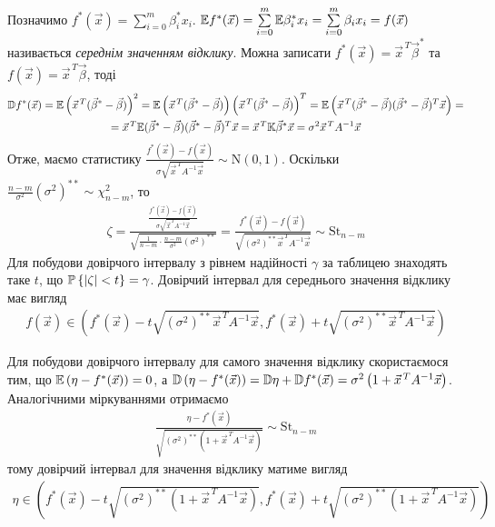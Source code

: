 Позначимо $f^*(\vec{x}) = \sum\limits_{i=0}^m \beta_i^* x_i$. 
$\E f^*(\vec{x}) = \sum\limits_{i=0}^m \E\beta_i^* x_i = \sum\limits_{i=0}^m \beta_i x_i = f(\vec{x})$
називається \emph{середнім значенням відклику}. Можна записати
$f^*(\vec{x}) = \vec{x}^{\, T} \vec{\beta}^*$ та $f(\vec{x}) = \vec{x}^{\, T} \vec{\beta}$, тоді
\begin{gather*}
    \D f^*(\vec{x}) = \E \left(\vec{x}^{\, T} (\vec{\beta}^* - \vec{\beta})\right)^2 = 
    \E \left(\vec{x}^{\, T} (\vec{\beta}^* - \vec{\beta})\right)\left(\vec{x}^{\, T} (\vec{\beta}^* - \vec{\beta})\right)^T = 
    \E\left(\vec{x}^{\, T} (\vec{\beta}^* - \vec{\beta}) (\vec{\beta}^* - \vec{\beta})^T \vec{x}\right) = \\
    = \vec{x}^{\, T} \E (\vec{\beta}^* - \vec{\beta}) (\vec{\beta}^* - \vec{\beta})^T \vec{x} = 
    \vec{x}^{\, T} \K\vec{\beta}^* \vec{x} = 
    \sigma^2 \vec{x}^{\, T} A^{-1} \vec{x}
\end{gather*}
Отже, маємо статистику
$
    \frac{f^*(\vec{x}) - f(\vec{x})}{\sigma \sqrt{\vec{x}^{\, T} A^{-1} \vec{x}}} \sim \mathrm{N}(0, 1)
$. Оскільки $\frac{n-m}{\sigma^2} (\sigma^2)^{**} \sim \chi^2_{n-m}$, то
\begin{gather*}
    \zeta = \frac{
        \frac{f^*(\vec{x}) - f(\vec{x})}{\sigma \sqrt{\vec{x}^{\, T} A^{-1} \vec{x}}}
    }{
        \sqrt{
            \frac{1}{n-m}\cdot \frac{n-m}{\sigma^2} (\sigma^2)^{**}
        }
    } = \frac{f^*(\vec{x}) - f(\vec{x})}{
        \sqrt{(\sigma^2)^{**} \vec{x}^{\, T} A^{-1} \vec{x}}
    } \sim \mathrm{St}_{n-m}
\end{gather*}
Для побудови довірчого інтервалу з рівнем надійності $\gamma$ за таблицею знаходять таке $t$, що
$\P\left\{|\zeta| < t \right\} = \gamma$. Довірчий інтервал для середнього значення відклику має вигляд
\begin{gather}\label{interv_1}
    f(\vec{x}) \in 
    \left(
        f^*(\vec{x}) - t \sqrt{(\sigma^2)^{**} \vec{x}^{\, T} A^{-1} \vec{x}}, 
        f^*(\vec{x}) + t \sqrt{(\sigma^2)^{**} \vec{x}^{\, T} A^{-1} \vec{x}}
    \right)
\end{gather}

Для побудови довірчого інтервалу для самого значення відклику скористаємося тим, що
$\E \left(\eta - f^*(\vec{x})\right) = 0$, а $\D\left(\eta - f^*(\vec{x})\right) = 
\D\eta + \D f^*(\vec{x}) = \sigma^2 \left(1 + \vec{x}^{\, T} A^{-1} \vec{x}\right)$. Аналогічними міркуваннями отримаємо
\begin{gather*}
    \frac{\eta - f^*(\vec{x})}{
        \sqrt{(\sigma^2)^{**} \left(1 + \vec{x}^{\, T} A^{-1} \vec{x}\right)}} \sim \mathrm{St}_{n-m}
\end{gather*}
тому довірчий інтервал для значення відклику матиме вигляд
\begin{gather}\label{interv_2}
    \eta \in
    \left(
        f^*(\vec{x}) - t \sqrt{(\sigma^2)^{**} \left(1 + \vec{x}^{\, T} A^{-1} \vec{x}\right)}, 
        f^*(\vec{x}) + t \sqrt{(\sigma^2)^{**} \left(1 + \vec{x}^{\, T} A^{-1} \vec{x}\right)}
    \right)
\end{gather}

